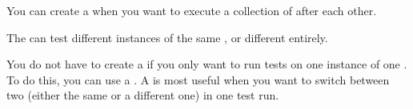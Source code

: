 
You can create a \gdjob{} when you want to execute a collection of \gdsuites{} after each other. 

The \gdsuites{} can test different instances of the same \gdaut{}, or different \gdauts{} entirely. 

You do not have to create a \gdjob{} if you only want to run tests on one instance of one \gdaut{}. To do this, you can use a \gdsuite{} . A \gdjob{} is most useful when you want to switch between two \gdauts{} (either the same \gdaut{} or a different one) in one test run. 


